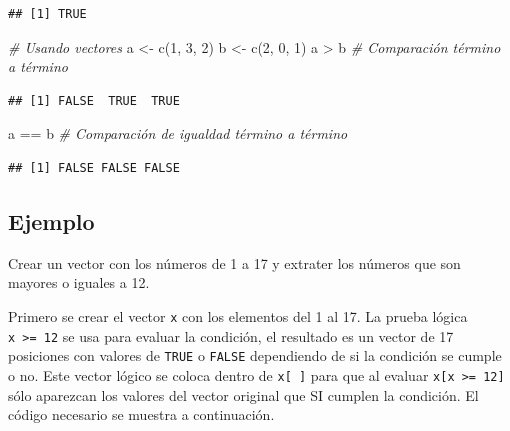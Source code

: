 \documentclass[
]{book}
\makeatletter
\newenvironment{Shaded}{\begin{snugshade}}{\end{snugshade}}
\newcommand{\CommentTok}[1]{\textcolor[rgb]{0.56,0.35,0.01}{\textit{#1}}}
\newcommand{\DecValTok}[1]{\textcolor[rgb]{0.00,0.00,0.81}{#1}}
\newcommand{\FunctionTok}[1]{\textcolor[rgb]{0.00,0.00,0.00}{#1}}
\newcommand{\NormalTok}[1]{#1}
\newcommand{\OtherTok}[1]{\textcolor[rgb]{0.56,0.35,0.01}{#1}}
\newcommand{\SpecialCharTok}[1]{\textcolor[rgb]{0.00,0.00,0.00}{#1}}
\newenvironment{kframe}{%
\medskip{}
\setlength{\fboxsep}{.8em}
 \def\at@end@of@kframe{}%
 \ifinner\ifhmode%
  \def\at@end@of@kframe{\end{minipage}}%
  \begin{minipage}{\columnwidth}%
 \fi\fi%
 \def\FrameCommand##1{\hskip\@totalleftmargin \hskip-\fboxsep
 \colorbox{shadecolor}{##1}\hskip-\fboxsep
     \hskip-\linewidth \hskip-\@totalleftmargin \hskip\columnwidth}%
 \MakeFramed {\advance\hsize-\width
   \@totalleftmargin\z@ \linewidth\hsize
   \@setminipage}}%
 {\par\unskip\endMakeFramed%
 \at@end@of@kframe}
\renewenvironment{Shaded}{\begin{kframe}}{\end{kframe}}
\makeatother
\begin{document}
\begin{verbatim}
## [1] TRUE
\end{verbatim}

\begin{Shaded}
\begin{Highlighting}[]
\CommentTok{\# Usando vectores}
\NormalTok{a }\OtherTok{\textless{}{-}} \FunctionTok{c}\NormalTok{(}\DecValTok{1}\NormalTok{, }\DecValTok{3}\NormalTok{, }\DecValTok{2}\NormalTok{)}
\NormalTok{b }\OtherTok{\textless{}{-}} \FunctionTok{c}\NormalTok{(}\DecValTok{2}\NormalTok{, }\DecValTok{0}\NormalTok{, }\DecValTok{1}\NormalTok{)}
\NormalTok{a }\SpecialCharTok{\textgreater{}}\NormalTok{ b  }\CommentTok{\# Comparación término a término}
\end{Highlighting}
\end{Shaded}

\begin{verbatim}
## [1] FALSE  TRUE  TRUE
\end{verbatim}

\begin{Shaded}
\begin{Highlighting}[]
\NormalTok{a }\SpecialCharTok{==}\NormalTok{ b  }\CommentTok{\# Comparación de igualdad término a término}
\end{Highlighting}
\end{Shaded}

\begin{verbatim}
## [1] FALSE FALSE FALSE
\end{verbatim}

\hypertarget{ejemplo-6}{%
\subsection*{Ejemplo}\label{ejemplo-6}}

Crear un vector con los números de 1 a 17 y extrater los números que son mayores o iguales a 12.

Primero se crear el vector \texttt{x} con los elementos del 1 al 17. La prueba lógica \texttt{x\ \textgreater{}=\ 12} se usa para evaluar la condición, el resultado es un vector de 17 posiciones con valores de \texttt{TRUE} o \texttt{FALSE} dependiendo de si la condición se cumple o no. Este vector lógico se coloca dentro de \texttt{x{[}\ {]}} para que al evaluar \texttt{x{[}x\ \textgreater{}=\ 12{]}} sólo aparezcan los valores del vector original que SI cumplen la condición. El código necesario se muestra a continuación.
\end{document}
